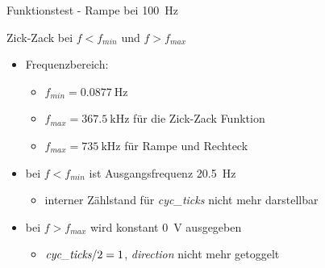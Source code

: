 \documentclass[11pt]{beamer}
\begin{document}
\begin{frame}{Funktionstest - Rampe bei \SI{100}{\hertz}}
  \begin{figure}[h] \centering
  \end{figure}
\end{frame}

\begin{frame}{Zick-Zack bei $f < f_{min}$ und $f > f_{max}$}
  \begin{itemize}
  \item Frequenzbereich:
    \begin{itemize}
      \item $f_{min} = \SI{0.0877}{\hertz}$
      \item $f_{max} = \SI{367.5}{\kilo\hertz}$ für die Zick-Zack Funktion
      \item $f_{max} = \SI{735}{\kilo\hertz}$ für Rampe und Rechteck
    \end{itemize}
  \item bei $f < f_{min}$ ist Ausgangsfrequenz \SI{20.5}{\hertz}
    \begin{itemize}
      \item interner Zählstand für \emph{cyc\_ticks} nicht mehr darstellbar
    \end{itemize}
  \item bei $f > f_{max}$ wird konstant \SI{0}{\volt} ausgegeben
    \begin{itemize}
      \item $\emph{cyc\_ticks} / 2 = 1$, \emph{direction} nicht mehr getoggelt
    \end{itemize}
  \end{itemize}
\end{frame}
\end{document}
